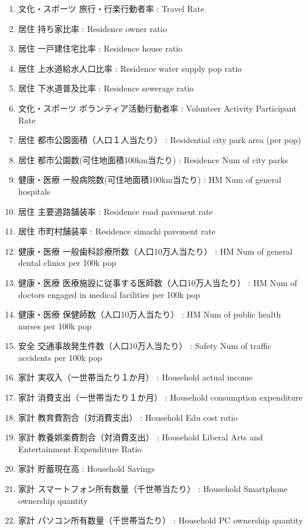 \begin{multicols}{2}
\begin{enumerate}
  \item 文化・スポーツ 旅行・行楽行動者率  :  Travel Rate
  \item 居住 持ち家比率  :  Residence owner ratio
  \item 居住 一戸建住宅比率  :  Residence house ratio
  \item 居住 上水道給水人口比率  :  Residence water supply pop ratio
  \item 居住 下水道普及比率  :  Residence sewerage ratio
  \item 文化・スポーツ ボランティア活動行動者率  :  Volunteer Activity Participant Rate
  \item 居住 都市公園面積（人口１人当たり）  :  Residential city park area (per pop)
  \item 居住 都市公園数(可住地面積100km当たり)  :  Residence Num of city parks
  \item 健康・医療 一般病院数(可住地面積100km当たり)  :  HM Num of general hospitals
  \item 居住 主要道路舗装率  :  Residence road pavement rate
  \item 居住 市町村舗装率  :  Residence simachi pavement rate
  \item 健康・医療 一般歯科診療所数（人口10万人当たり）  :  HM Num of general dental clinics per 100k pop
  \item 健康・医療 医療施設に従事する医師数（人口10万人当たり）  :  HM Num of doctors engaged in medical facilities per 100k pop
  \item 健康・医療 保健師数（人口10万人当たり）  :  HM Num of public health nurses per 100k pop
  \item 安全 交通事故発生件数（人口10万人当たり）  :  Safety Num of traffic accidents per 100k pop
  \item 家計 実収入（一世帯当たり１か月）  :  Household actual income
  \item 家計 消費支出（一世帯当たり１か月）  :  Household consumption expenditure
  \item 家計 教育費割合（対消費支出）  :  Household Edu cost ratio
  \item 家計 教養娯楽費割合（対消費支出）  :  Household Liberal Arts and Entertainment Expenditure Ratio
  \item 家計 貯蓄現在高  :  Household Savings
  \item 家計 スマートフォン所有数量（千世帯当たり）  :  Household Smartphone ownership quantity
  \item 家計 パソコン所有数量（千世帯当たり）  :  Household PC ownership quantity

\end{enumerate}
\end{multicols}
